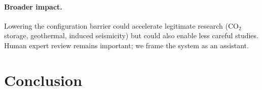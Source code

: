 \documentclass{article}
\begin{document}

\paragraph{Broader impact.} Lowering the configuration barrier could accelerate legitimate research (CO$_2$ storage, geothermal, induced seismicity) but could also enable less careful studies. Human expert review remains important; we frame the system as an assistant.


\section{Conclusion}
\label{sec:conclusion}
\end{document}
